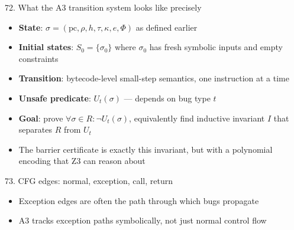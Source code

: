 \documentclass[aspectratio=169]{beamer}
\begin{document}
\begin{frame}{72. What the A3 transition system looks like precisely}
\begin{itemize}
  \item \textbf{State}: \(\sigma = (\text{pc}, \rho, h, \tau, \kappa, e, \Phi)\) as defined earlier
  \item \textbf{Initial states}: \(S_0 = \{\sigma_0\}\) where \(\sigma_0\) has fresh symbolic inputs and empty constraints
  \item \textbf{Transition}: bytecode-level small-step semantics, one instruction at a time
  \item \textbf{Unsafe predicate}: \(U_t(\sigma)\) --- depends on bug type \(t\)
  \item \textbf{Goal}: prove \(\forall \sigma \in R : \neg U_t(\sigma)\), equivalently find inductive invariant \(I\) that separates \(R\) from \(U_t\)
  \item The barrier certificate is exactly this invariant, but with a polynomial encoding that Z3 can reason about
\end{itemize}
\end{frame}

\begin{frame}{73. CFG edges: normal, exception, call, return}
\begin{center}
\end{center}
\begin{itemize}
  \item Exception edges are often the path through which bugs propagate
  \item A3 tracks exception paths symbolically, not just normal control flow
\end{itemize}
\end{frame}
\end{document}
